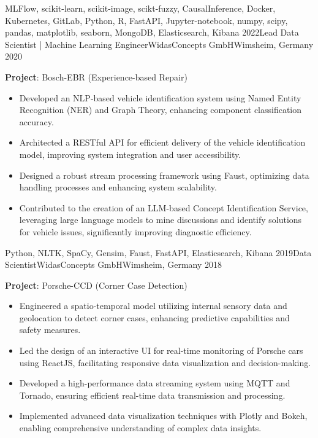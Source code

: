 \begin{experiences}
{\begin{itemize}
		\end{itemize}
	}
	{MLFlow, scikit-learn, scikit-image, scikt-fuzzy, CausalInference, Docker, Kubernetes, GitLab, Python, R,  FastAPI, Jupyter-notebook, numpy, scipy, pandas, matplotlib, seaborn, MongoDB, Elasticsearch, Kibana}
	\emptySeparator
	\experience
	{2022}{Lead Data Scientist | Machine Learning Engineer}{WidasConcepts GmbH}{Wimsheim, Germany}
	{2020} {
		\vspace{0.1cm}
		\textbf{Project}: Bosch-EBR (Experience-based Repair)
		\begin{itemize}
    \item Developed an NLP-based vehicle identification system using Named Entity Recognition (NER) and Graph Theory, enhancing component classification accuracy.
\item Architected a RESTful API for efficient delivery of the vehicle identification model, improving system integration and user accessibility.
\item Designed a robust stream processing framework using Faust, optimizing data handling processes and enhancing system scalability.
\item Contributed to the creation of an LLM-based Concept Identification Service, leveraging large language models to mine discussions and identify solutions for vehicle issues, significantly improving diagnostic efficiency.

		\end{itemize}
	}
	{Python, NLTK, SpaCy, Gensim, Faust, FastAPI, Elasticsearch, Kibana}
	\emptySeparator
	\experience
	{2019}{Data Scientist}{WidasConcepts GmbH}{Wimsheim, Germany}
	{2018} {
		\vspace{0.1cm}
		\textbf{Project}: Porsche-CCD (Corner Case Detection)
		\begin{itemize}
    \item Engineered a spatio-temporal model utilizing internal sensory data and geolocation to detect corner cases, enhancing predictive capabilities and safety measures.
\item Led the design of an interactive UI for real-time monitoring of Porsche cars using ReactJS, facilitating responsive data visualization and decision-making.
\item Developed a high-performance data streaming system using MQTT and Tornado, ensuring efficient real-time data transmission and processing.
\item Implemented advanced data visualization techniques with Plotly and Bokeh, enabling comprehensive understanding of complex data insights.


\end{itemize}}
\end{experiences}
